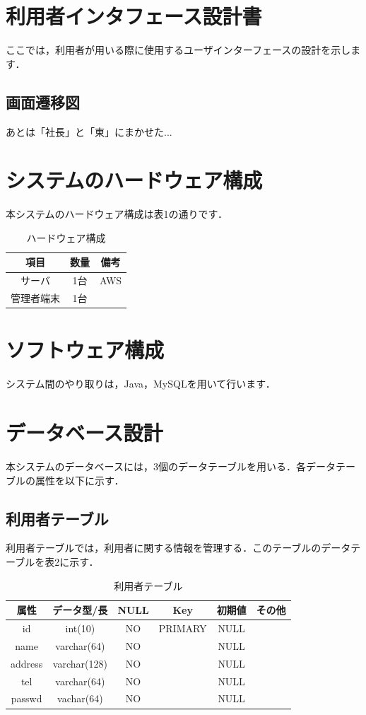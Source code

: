 \documentclass[a4j,titlepage]{jarticle}
\begin{document}
\section{利用者インタフェース設計書}
ここでは，利用者が用いる際に使用するユーザインターフェースの設計を示します．

\subsection{画面遷移図}
あとは「社長」と「東」にまかせた...




\section{システムのハードウェア構成}
本システムのハードウェア構成は表1の通りです．
\begin{table}[htbp]
\begin{center}
 \caption{ハードウェア構成}
  \begin{tabular}{|c|c|c|}\hline
    項目 & 数量 & 備考\\ \hline \hline
    サーバ & 1台 & AWS\\ \hline
    管理者端末 & 1台 & \\ \hline
  \end{tabular}
\end{center}
\end{table}


\section{ソフトウェア構成}
システム間のやり取りは，Java，MySQLを用いて行います．

\section{データベース設計}
本システムのデータベースには，3個のデータテーブルを用いる．各データテーブルの属性を以下に示す．

\subsection{利用者テーブル}
利用者テーブルでは，利用者に関する情報を管理する．このテーブルのデータテーブルを表2に示す．
\begin{table}[htbp]
\begin{center}
 \caption{利用者テーブル}
  \begin{tabular}{|c|c|c|c|c|c|}\hline
    属性 & データ型/長 & NULL & Key & 初期値 & その他\\ \hline \hline
    id & int(10) & NO & PRIMARY & NULL & \\ \hline
    name & varchar(64) & NO &  & NULL & \\ \hline
    address & varchar(128) & NO &  & NULL & \\ \hline
    tel & varchar(64) & NO &  & NULL & \\ \hline
    passwd & vachar(64) & NO &  & NULL & \\ \hline
  \end{tabular}
\end{center}
\end{table}
\end{document}
